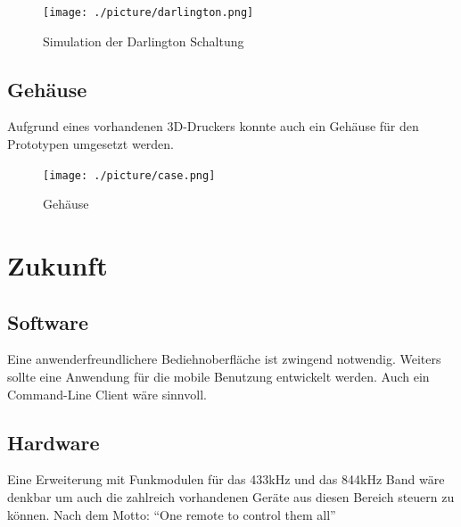 \documentclass[11pt,a4paper,bibtotoc,oneside]{scrbook}
\begin{document}
        \begin{figure}[!ht]
    \centering
        \texttt{[image: ./picture/darlington.png]}
        \caption{\label{lm324}{Simulation der Darlington Schaltung}}
    \end{figure}

\section{Gehäuse}
Aufgrund eines vorhandenen 3D-Druckers konnte auch ein Gehäuse für den Prototypen umgesetzt werden.
        \begin{figure}[!ht]
    \centering
        \texttt{[image: ./picture/case.png]}
        \caption{\label{lm324}{Gehäuse}}
    \end{figure}
\chapter{Zukunft}

\section{Software}
Eine anwenderfreundlichere Bediehnoberfläche ist zwingend notwendig. Weiters sollte eine Anwendung für die
mobile Benutzung entwickelt werden. Auch ein Command-Line Client wäre sinnvoll.

\section{Hardware}
Eine Erweiterung mit Funkmodulen für das 433kHz und das 844kHz Band wäre denkbar um auch die zahlreich vorhandenen
Geräte aus diesen Bereich steuern zu können. Nach dem Motto: ``One remote to control them all''



%
%

%
\end{document}
